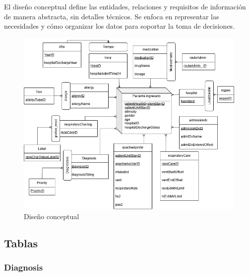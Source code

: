 \documentclass[12pt, a4paper, twoside]{article}
\begin{document}
	El diseño conceptual define las entidades, relaciones y requisitos de información de manera abstracta, sin detalles técnicos. Se enfoca en representar las necesidades y cómo organizar los datos para soportar la toma de decisiones.
	
	
	
	\begin{figure}[h!]
		\begin{center}  %
			\includegraphics[width=1\textwidth]{image/diseno_conceptual.png}
			\caption{Diseño conceptual}
			\label{fig:conceptual}
		\end{center}
	\end{figure}
	
	
	
	\subsection{Tablas}
	
	\subsubsection{Diagnosis} 
	
\end{document}
